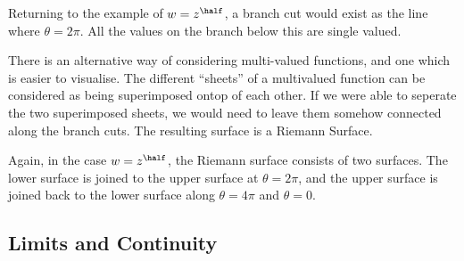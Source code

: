 \begin{example}
  Returning to the example of $w = z^{\half}$, a branch cut would
  exist as the line where $\theta = 2 \pi$. All the values on the
  branch below this are single valued.
\end{example}
There is an alternative way of considering multi-valued functions, and
one which is easier to visualise. The different ``sheets'' of a
multivalued function can be considered as being superimposed ontop of
each other. If we were able to seperate the two superimposed sheets,
we would need to leave them somehow connected along the branch
cuts. The resulting surface is a Riemann Surface.
\begin{example}
  Again, in the case $w = z^{\half}$, the Riemann surface consists of
  two surfaces. The lower surface is joined to the upper surface at
  $\theta=2 \pi$, and the upper surface is joined back to the lower
  surface along $\theta=4 \pi$ and $\theta=0$.
\end{example}

\subsection{Limits and Continuity}
\label{sec:limits}

